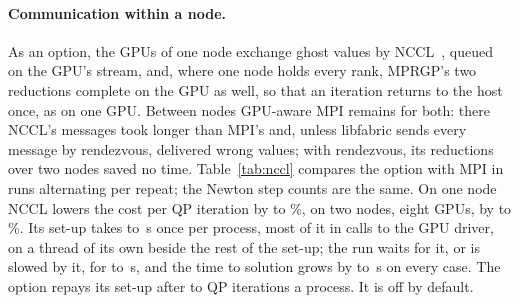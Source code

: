 \documentclass[sigconf,nonacm]{acmart}
\begin{document}
\paragraph{Communication within a node.} As an option, the GPUs of one node exchange ghost values
by NCCL~\cite{nccl}, queued on the GPU's stream, and, where one node holds every rank, MPRGP's two
reductions complete on the GPU as well, so that an iteration returns to the host once, as on one
GPU. Between nodes GPU-aware MPI remains for both: there NCCL's messages took longer than MPI's
and, unless libfabric sends every message by rendezvous, delivered wrong values; with rendezvous,
its reductions over two nodes saved no time. Table~\ref{tab:nccl} compares the option with MPI in
\ncclRuns{} runs alternating per repeat; the Newton step counts are the same. On one node NCCL
lowers the cost per QP iteration by \ncclOneGainMin{} to \ncclOneGainMax\%, on two nodes, eight
GPUs, by \ncclEightGainMin{} to \ncclEightGainMax\%. Its set-up takes \ncclInitMin{} to
\ncclInitMax\,\si{\second} once per process, most of it in calls to the GPU driver, on a thread of
its own beside the rest of the set-up; the run waits for it, or is slowed by it, for
\ncclCostMin{} to \ncclCostMax\,\si{\second}, and the time to solution grows by \ncclExtraMin{}
to \ncclExtraMax\,\si{\second} on every case. The option repays its set-up after
\ncclBreakEvenMin{} to \ncclBreakEvenMax{} QP iterations a process. It is off by default.

\begin{table}
\caption{Cost per QP iteration (\si{\micro\second}) and time to solution (\si{\second}), median of
\benchRepeats{} runs. Grace configurations are ranks $\times$ threads.}
\label{tab:performance}
\small

\end{table}

\begin{table}
\caption{The tangent in double and in single precision on one node: cost per QP iteration and
time to solution, median of \benchRepeats{} runs each.}
\label{tab:precision}
\small
\setlength{\tabcolsep}{3.5pt}

\end{table}

\begin{table}
\caption{Communication within a node by MPI and by NCCL: cost per QP iteration, what NCCL's set-up
costs a run (the longer set-up and the wait at the first communication) and the QP iterations
that repay it, and time to solution (set-up and solve), median of \benchRepeats{} runs each.}
\label{tab:nccl}
\small

\end{table}
\end{document}
